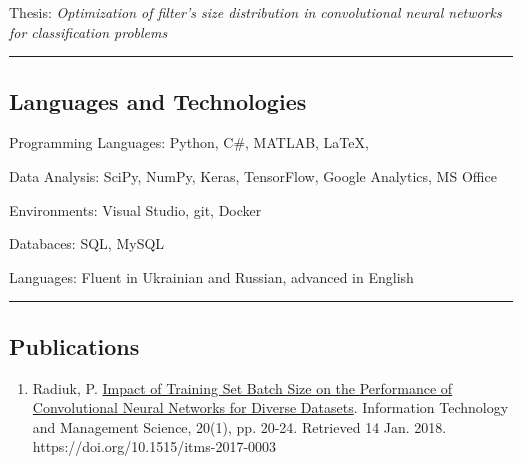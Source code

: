\documentclass[10pt,letterpaper]{article}
\newenvironment{indentsection}[1]%
{\begin{list}{}%
	{\setlength{\leftmargin}{#1}}%
	\item[]%
}
{\end{list}}
\begin{document}
\begin{itemize}

\end{itemize}

\hrule
\vspace{-0.4em}
\subsection*{Languages and Technologies}

\begin{indentsection}{\parindent}
\begin{description*}
	\item[Programming Languages:]
	Python, C\#, MATLAB, \LaTeX, 
	\item[Data Analysis:]
	SciPy, NumPy, Keras, TensorFlow, Google Analytics, MS Office
	\item[Environments:]
	Visual Studio, git, Docker
	\item[Databaces:]
	SQL, MySQL
	\item[Languages:]
	Fluent in Ukrainian and Russian, advanced in English
\end{description*}
\end{indentsection}

\hrule
\vspace{-0.4em}
\subsection*{Publications}

\begin{enumerate}
	\parskip=0.1em
	
	
	\item Radiuk, P. \href{https://www.degruyter.com/downloadpdf/j/itms.2017.20.issue-1/itms-2017-0003/itms-2017-0003.pdf}{Impact of Training Set Batch Size on the Performance of Convolutional Neural Networks for Diverse Datasets}. Information Technology and Management Science, 20(1), pp. 20-24. Retrieved 14 Jan. 2018. https://doi.org/10.1515/itms-2017-0003

\end{enumerate}
\end{document}
